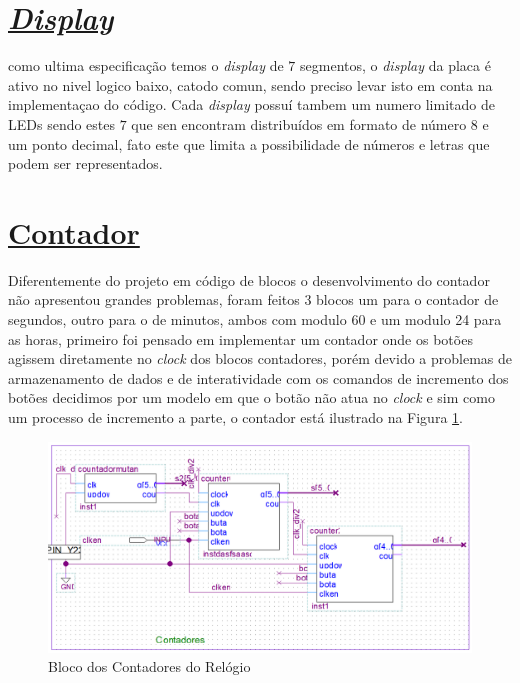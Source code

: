 \documentclass[14pt, oneside]{book}
\newcommand\tab[1][1cm]{\hspace*{#1}}
\theoremstyle{definition}
\begin{document}
            \section[\textit{Display}]{\hyperlink{toc}{\textit{Display}}}
                \tab como ultima especificação temos o \textit{display} de $7$ segmentos, o \textit{display} da placa é ativo no nivel logico baixo, catodo comun, sendo preciso levar isto em conta na implementaçao do código. Cada \textit{display} possuí tambem um numero limitado de LEDs sendo estes $7$ que sen encontram distribuídos em formato de número $8$ e um ponto decimal, fato este que limita a possibilidade de números e letras que podem ser representados.\\
                
            \section[Contador]{\hyperlink{toc}{Contador}}
                \tab Diferentemente do projeto em código de blocos o desenvolvimento do contador não apresentou grandes problemas, foram feitos 3 blocos um para o contador de segundos, outro para o de minutos, ambos com modulo 60 e um modulo 24 para as horas, primeiro foi pensado em implementar um contador onde os botões agissem diretamente no \textit{clock} dos blocos contadores, porém devido a problemas de armazenamento de dados e de interatividade com os comandos de incremento dos botões decidimos por um modelo em que o botão não atua no \textit{clock} e sim como um processo de incremento a parte, o contador está ilustrado na Figura \ref{bloco contador}. \\
                \begin{figure}[H]
                    \centering
                    \includegraphics[scale=0.7]{bloco_contador.PNG}
                    \caption{Bloco dos Contadores do Relógio}
                    \label{bloco contador}
                \end{figure} \\
                
\end{document}
